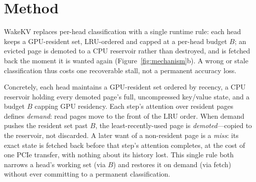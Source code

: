 \documentclass{article}
\begin{document}
\section{Method}
\label{sec:method}

WakeKV replaces per-head classification with a single runtime rule:
each head keeps a GPU-resident set,
LRU-ordered and capped at a per-head budget $B$; an evicted page is
demoted to a CPU reservoir rather than destroyed, and is fetched back
the moment it is wanted again (Figure~\ref{fig:mechanism}b). A wrong or
stale classification thus costs one recoverable stall, not a permanent
accuracy loss.

Concretely, each head maintains a GPU-resident set ordered by
recency, a CPU reservoir holding every demoted page's full,
uncompressed key/value state, and a budget $B$ capping GPU residency.
Each step's attention over resident pages defines \emph{demand}: read
pages move to the front of the LRU order. When demand pushes the
resident set past $B$, the least-recently-used page is
\emph{demoted}---copied to the reservoir, not discarded. A later want
of a non-resident page is a \emph{miss}: its exact state is fetched
back before that step's attention completes, at the cost of one PCIe
transfer, with nothing about its history lost. This single rule both
narrows a head's working set (via $B$) and restores it on demand (via
fetch) without ever committing to a permanent classification.
\end{document}
